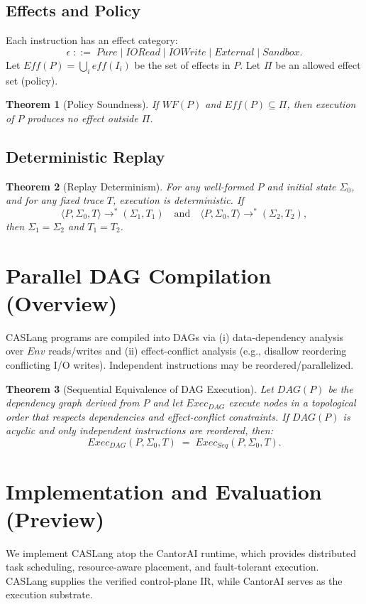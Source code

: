 \documentclass[sigplan,nonacm,10pt]{acmart}
\newtheorem{theorem}{Theorem}
\begin{document}
\subsection{Effects and Policy}
Each instruction has an effect category:
\[
\epsilon \;::=\; Pure \mid IORead \mid IOWrite \mid External \mid Sandbox.
\]
Let $Eff(P)=\bigcup_i eff(I_i)$ be the set of effects in $P$. Let $\Pi$ be an allowed effect set (policy).

\begin{theorem}[Policy Soundness]
If $WF(P)$ and $Eff(P)\subseteq \Pi$, then execution of $P$ produces no effect outside $\Pi$.
\end{theorem}

\subsection{Deterministic Replay}
\begin{theorem}[Replay Determinism]
For any well-formed $P$ and initial state $\Sigma_0$, and for any fixed trace $T$, execution is deterministic. If
\[
\langle P,\Sigma_0,T\rangle \rightarrow^* (\Sigma_1,T_1)
\quad\text{and}\quad
\langle P,\Sigma_0,T\rangle \rightarrow^* (\Sigma_2,T_2),
\]
then $\Sigma_1=\Sigma_2$ and $T_1=T_2$.
\end{theorem}

\section{Parallel DAG Compilation (Overview)}
CASLang programs are compiled into DAGs via (i) data-dependency analysis over $Env$ reads/writes and (ii) effect-conflict analysis (e.g., disallow reordering conflicting I/O writes). Independent instructions may be reordered/parallelized.

\begin{theorem}[Sequential Equivalence of DAG Execution]
Let $DAG(P)$ be the dependency graph derived from $P$ and let $Exec_{DAG}$ execute nodes in a topological order that respects dependencies and effect-conflict constraints. If $DAG(P)$ is acyclic and only independent instructions are reordered, then:
\[
Exec_{DAG}(P,\Sigma_0,T) \;=\; Exec_{Seq}(P,\Sigma_0,T).
\]
\end{theorem}

\section{Implementation and Evaluation (Preview)}
We implement CASLang atop the CantorAI runtime, which provides distributed task scheduling, resource-aware placement, and fault-tolerant execution. CASLang supplies the verified control-plane IR, while CantorAI serves as the execution substrate.
\end{document}
